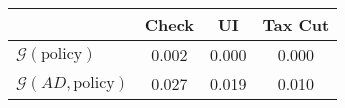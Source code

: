 \begin{tabular}{@{}lccc@{}} 
\toprule 
                          & Check      & UI    & Tax Cut    \\  \midrule 
$\mathcal{G}(\text{policy})$ & 0.002  & 0.000  & 0.000     \\ 
$\mathcal{G}(AD,\text{policy})$ & 0.027  & 0.019  & 0.010     \\ 
\end{tabular}  

